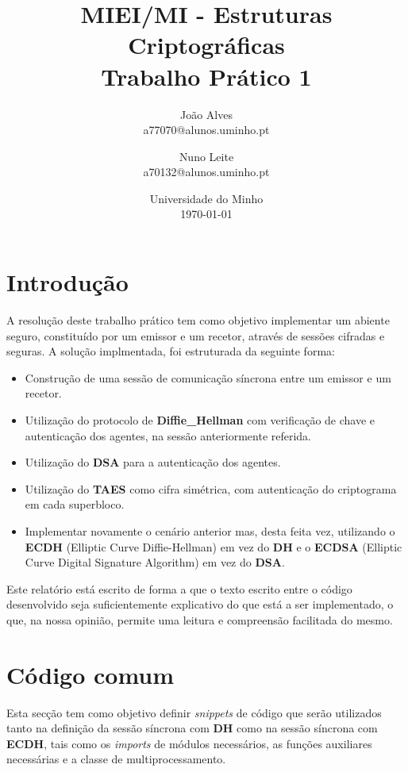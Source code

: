 \documentclass[11pt]{article}
\title{MIEI/MI - Estruturas Criptográficas\\
            \large Trabalho Prático 1}
\author{
        João Alves \\
        a77070@alunos.uminho.pt
        \and
        Nuno Leite \\
        a70132@alunos.uminho.pt
    }
\date{
        Universidade do Minho\\
        \today
    }
\providecommand{\tightlist}{%
      \setlength{\itemsep}{0pt}\setlength{\parskip}{0pt}}
\begin{document}
    
    
    \maketitle
    

    \hypertarget{introduuxe7uxe3o}{%
\section{Introdução}\label{introduuxe7uxe3o}}

    A resolução deste trabalho prático tem como objetivo implementar um
abiente seguro, constituído por um emissor e um recetor, através de
sessões cifradas e seguras. A solução implmentada, foi estruturada da
seguinte forma:

\begin{itemize}
\tightlist
\item
  Construção de uma sessão de comunicação síncrona entre um emissor e um
  recetor.
\item
  Utilização do protocolo de \textbf{Diffie\_Hellman} com verificação de
  chave e autenticação dos agentes, na sessão anteriormente referida.
\item
  Utilização do \textbf{DSA} para a autenticação dos agentes.
\item
  Utilização do \textbf{TAES} como cifra simétrica, com autenticação do
  criptograma em cada superbloco.
\item
  Implementar novamente o cenário anterior mas, desta feita vez,
  utilizando o \textbf{ECDH} (Elliptic Curve Diffie-Hellman) em vez do
  \textbf{DH} e o \textbf{ECDSA} (Elliptic Curve Digital Signature
  Algorithm) em vez do \textbf{DSA}.
\end{itemize}

Este relatório está escrito de forma a que o texto escrito entre o
código desenvolvido seja suficientemente explicativo do que está a ser
implementado, o que, na nossa opinião, permite uma leitura e compreensão
facilitada do mesmo.

    \hypertarget{cuxf3digo-comum}{%
\section{Código comum}\label{cuxf3digo-comum}}

    Esta secção tem como objetivo definir \emph{snippets} de código que
serão utilizados tanto na definição da sessão síncrona com \textbf{DH}
como na sessão síncrona com \textbf{ECDH}, tais como os \emph{imports}
de módulos necessários, as funções auxiliares necessárias e a classe de
multiprocessamento.
\end{document}

